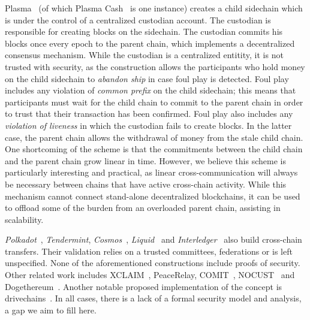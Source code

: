 Plasma~\cite{plasma} (of which Plasma Cash~\cite{plasmacash} is one instance)
creates a child sidechain which is under the control of a centralized custodian
account. The custodian is responsible for creating blocks on the sidechain. The
custodian commits his blocks once every epoch to the parent chain, which
implements a decentralized consensus mechanism. While the custodian is a
centralized entitity, it is not trusted with security, as the construction
allows the participants who hold money on the child sidechain to \emph{abandon
ship} in case foul play is detected. Foul play includes any violation of
\emph{common prefix} on the child sidechain; this means that participants must
wait for the child chain to commit to the parent chain in order to trust that
their transaction has been confirmed. Foul play also includes any
\emph{violation of liveness} in which the custodian fails to create blocks. In
the latter case, the parent chain allows the withdrawal of money from the stale
child chain. One shortcoming of the scheme is that the commitments between the
child chain and the parent chain grow linear in time. However, we believe this
scheme is particularly interesting and practical, as linear cross-communication
will always be necessary between chains that have active cross-chain activity.
While this mechanism cannot connect stand-alone decentralized blockchains, it
can be used to offload some of the burden from an overloaded parent chain,
assisting in scalability.

\emph{Polkadot}~\cite{polkadot}, \emph{Tendermint},
\emph{Cosmos}~\cite{tendermint}, \emph{Liquid}~\cite{federated-interoperability} and
\emph{Interledger}~\cite{interledger} also build cross-chain transfers. Their
validation relies on a trusted committees, federations or is left unspecified.
None of the aforementioned constructions include proofs of security. Other
related work includes XCLAIM~\cite{xclaim}, PeaceRelay, COMIT~\cite{comit},
NOCUST~\cite{nocust} and Dogethereum~\cite{dogethereum}. Another notable
proposed implementation of the concept is drivechains~\cite{drivechains,lerner}.
In all cases, there is a lack of a formal security model and
analysis, a gap we aim to fill here.
